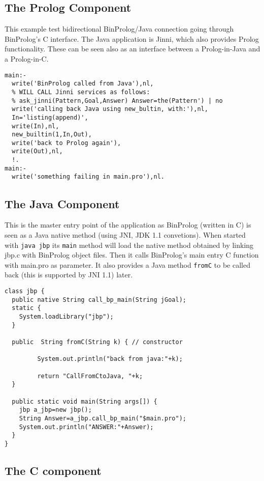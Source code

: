 \documentclass{article}
\begin{document}
\subsection{The Prolog Component}

This example test bidirectional BinProlog/Java connection going through
BinProlog's C interface. The Java application is Jinni, which 
also provides Prolog functionality. These can be seen also as an interface
between a Prolog-in-Java and a Prolog-in-C.

\begin{verbatim}
main:-
  write('BinProlog called from Java'),nl,
  % WILL CALL Jinni services as follows:
  % ask_jinni(Pattern,Goal,Answer) Answer=the(Pattern') | no
  write('calling back Java using new_bultin, with:'),nl,
  In='listing(append)',
  write(In),nl,
  new_builtin(1,In,Out),
  write('back to Prolog again'),
  write(Out),nl,
  !.
main:-
  write('something failing in main.pro'),nl.
\end{verbatim}

\subsection{The Java Component}

This is the master entry point of the application as BinProlog 
(written in C) is seen as a Java native method (using JNI, JDK 1.1 convetions).
When started with {\tt java jbp} its {\tt main} method will load the
native method obtained by linking jbp.c with BinProlog object files.
Then it calls BinProlog's main entry C function with main.pro as parameter.
It also provides a Java method {\tt fromC} to be called back
(this is supported by JNI 1.1) later.

\begin{verbatim}
class jbp {
  public native String call_bp_main(String jGoal);
  static {
    System.loadLibrary("jbp");
  }
  
  public  String fromC(String k) { // constructor
                  
         System.out.println("back from java:"+k);
              
         return "CallFromCtoJava, "+k;
  }

  public static void main(String args[]) {
    jbp a_jbp=new jbp();
    String Answer=a_jbp.call_bp_main("$main.pro"); 
    System.out.println("ANSWER:"+Answer);
  }
}
\end{verbatim}

\subsection{The C component}
\end{document}
